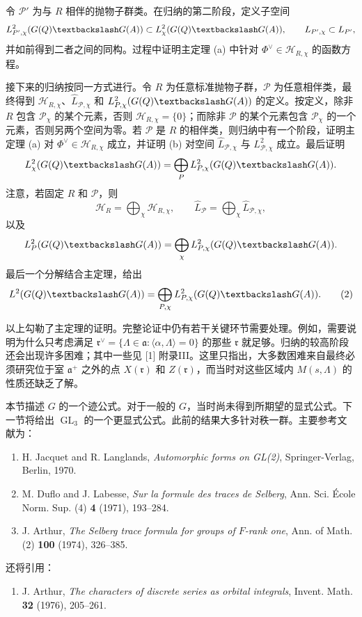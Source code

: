 令 $\mathcal P'$ 为与 $R$ 相伴的抛物子群类。在归纳的第二阶段，定义子空间
\[
 L_{\mathcal P',\chi}^2(G(\Q)\backslash G(A))\subset L_\chi^2(G(\Q)\backslash G(A)),
 \qquad\widehat L_{\mathcal P',\chi}\subset\widehat L_{\mathcal P'},
\]
并如前得到二者之间的同构。过程中证明主定理 (a) 中针对 $\Phi^\vee\in\mathcal H_{R,\chi}$ 的函数方程。

接下来的归纳按同一方式进行。令 $R$ 为任意标准抛物子群，$\mathcal P$ 为任意相伴类，最终得到
$\mathcal H_{R,\chi}$、$\widehat L_{\mathcal P,\chi}$ 和 $L_{\mathcal P,\chi}^2(G(\Q)\backslash G(A))$ 的定义。按定义，除非 $R$ 包含 $\mathcal P_\chi$ 的某个元素，否则 $\mathcal H_{R,\chi}=\{0\}$；而除非 $\mathcal P$ 的某个元素包含 $\mathcal P_\chi$ 的一个元素，否则另两个空间为零。若 $\mathcal P$ 是 $R$ 的相伴类，则归纳中有一个阶段，证明主定理 (a) 对 $\Phi^\vee\in\mathcal H_{R,\chi}$ 成立，并证明 (b) 对空间 $\widehat L_{\mathcal P,\chi}$ 与 $L_{\mathcal P,\chi}^2$ 成立。最后证明
\[
 L_\chi^2(G(\Q)\backslash G(A))=\bigoplus_\mathcal P L_{\mathcal P,\chi}^2(G(\Q)\backslash G(A)).
\]
注意，若固定 $R$ 和 $\mathcal P$，则
\[
 \mathcal H_R=\bigoplus_\chi\mathcal H_{R,\chi},\qquad
 \widehat L_\mathcal P=\bigoplus_\chi\widehat L_{\mathcal P,\chi},
\]
以及
\[
 L_\mathcal P^2(G(\Q)\backslash G(A))=\bigoplus_\chi
 L_{\mathcal P,\chi}^2(G(\Q)\backslash G(A)).
\]
最后一个分解结合主定理，给出
\begin{equation}
 L^2(G(\Q)\backslash G(A))=\bigoplus_{\mathcal P,\chi}
 L_{\mathcal P,\chi}^2(G(\Q)\backslash G(A)).\tag{2}
\end{equation}

以上勾勒了主定理的证明。完整论证中仍有若干关键环节需要处理。例如，需要说明为什么只考虑满足
$\mathfrak r^\vee=\{\Lambda\in\mathfrak a:\langle\alpha,\Lambda\rangle=0\}$ 的那些 $\mathfrak r$ 就足够。归纳的较高阶段还会出现许多困难；其中一些见 [1] 附录III。这里只指出，大多数困难来自最终必须研究位于室 $\mathfrak a^+$ 之外的点 $X(\mathfrak r)$ 和 $Z(\mathfrak r)$，而当时对这些区域内 $M(s,\Lambda)$ 的性质还缺乏了解。

本节描述 $G$ 的一个迹公式。对于一般的 $G$，当时尚未得到所期望的显式公式。下一节将给出 $\operatorname{GL}_3$ 的一个更显式公式。此前的结果大多针对秩一群。主要参考文献为：
\begin{enumerate}
\item[4.] H. Jacquet and R. Langlands, \emph{Automorphic forms on GL(2)}, Springer-Verlag, Berlin, 1970.
\item[5.] M. Duflo and J. Labesse, \emph{Sur la formule des traces de Selberg}, Ann. Sci. École Norm. Sup. (4) \textbf{4} (1971), 193--284.
\item[6.] J. Arthur, \emph{The Selberg trace formula for groups of $F$-rank one}, Ann. of Math. (2) \textbf{100} (1974), 326--385.
\end{enumerate}
还将引用：
\begin{enumerate}
\item[7.] J. Arthur, \emph{The characters of discrete series as orbital integrals}, Invent. Math. \textbf{32} (1976), 205--261.
\end{enumerate}

